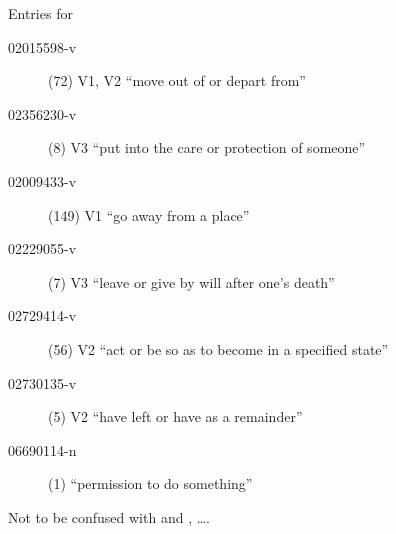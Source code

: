 \documentclass{beamer}
\begin{document}
\begin{frame}[allowframebreaks]{Entries for }
\begin{description}
\item [02015598-v] (72)
V1, V2 	 ``move out of or depart from''

\item [02356230-v] (8)
V3 	 ``put into the care or protection of someone''
      \item [02009433-v] (149)
V1 	 ``go away from a place''
\item[02229055-v] (7)
V3 	 ``leave or give by will after one's death''
\item [02729414-v] (56) V2 	 ``act or be so as to become in a specified state''
\item [02730135-v] (5) V2  ``have left or have as a remainder''

\item [06690114-n] (1)  ``permission to do something''
\end{description}

Not to be confused with  and , \ldots .
\end{frame}
\end{document}
